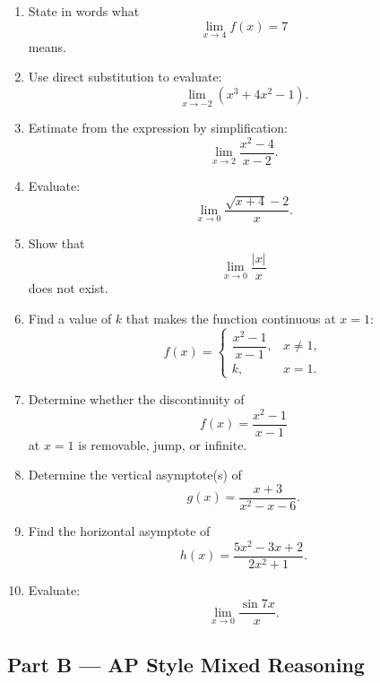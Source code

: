 \documentclass[11pt]{article}
\begin{document}
\begin{enumerate}
    \item State in words what
    \[
    \lim_{x\to 4}f(x)=7
    \]
    means.

    \item Use direct substitution to evaluate:
    \[
    \lim_{x\to -2}(x^3+4x^2-1).
    \]

    \item Estimate from the expression by simplification:
    \[
    \lim_{x\to 2}\frac{x^2-4}{x-2}.
    \]

    \item Evaluate:
    \[
    \lim_{x\to 0}\frac{\sqrt{x+4}-2}{x}.
    \]

    \item Show that
    \[
    \lim_{x\to 0}\frac{|x|}{x}
    \]
    does not exist.

    \item Find a value of $k$ that makes the function continuous at $x=1$:
    \[
    f(x)=
    \begin{cases}
    \dfrac{x^2-1}{x-1}, & x\neq 1,\\[0.6em]
    k, & x=1.
    \end{cases}
    \]

    \item Determine whether the discontinuity of
    \[
    f(x)=\frac{x^2-1}{x-1}
    \]
    at $x=1$ is removable, jump, or infinite.

    \item Determine the vertical asymptote(s) of
    \[
    g(x)=\frac{x+3}{x^2-x-6}.
    \]

    \item Find the horizontal asymptote of
    \[
    h(x)=\frac{5x^2-3x+2}{2x^2+1}.
    \]

    \item Evaluate:
    \[
    \lim_{x\to 0}\frac{\sin 7x}{x}.
    \]
\end{enumerate}

\subsection*{Part B --- AP Style Mixed Reasoning}
\end{document}
